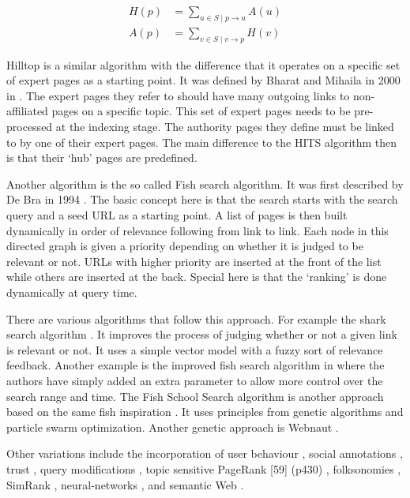 \begin{equation}
  \begin{split}
  H(p) &= \sum_{u\in S \mid p\to u}A(u)\\
  A(p) &= \sum_{v\in S \mid v\to p}H(v)
  \end{split}
  \label{eq:HITS}
\end{equation}

Hilltop is a similar algorithm with the difference that it operates on a specific set of expert pages as a starting point. It was defined by Bharat and Mihaila in 2000 in \autocite{Bharat2000}. The expert pages they refer to should have many outgoing links to non-affiliated pages on a specific topic. This set of expert pages needs to be pre-processed at the indexing stage. The authority pages they define must be linked to by one of their expert pages. The main difference to the HITS algorithm then is that their `hub' pages are predefined.

Another algorithm is the so called Fish search algorithm. It was first described by De Bra in 1994 \autocite{DeBra1994, DeBra1994a, DeBra}. The basic concept here is that the search starts with the search query and a seed URL as a starting point. A list of pages is then built dynamically in order of relevance following from link to link. Each node in this directed graph is given a priority depending on whether it is judged to be relevant or not. URLs with higher priority are inserted at the front of the list while others are inserted at the back. Special here is that the `ranking' is done dynamically at query time.

There are various algorithms that follow this approach. For example the shark search algorithm \autocite{Hersovici1998}. It improves the process of judging whether or not a given link is relevant or not. It uses a simple vector model with a fuzzy sort of relevance feedback. Another example is the improved fish search algorithm in \autocite{Luo2005} where the authors have simply added an extra parameter to allow more control over the search range and time. The Fish School Search algorithm is another approach based on the same fish inspiration \autocite{BastosFilho2008}. It uses principles from genetic algorithms and particle swarm optimization. Another genetic approach is Webnaut \autocite{Nick2001}.

Other variations include the incorporation of user behaviour \autocite{Agichtein2006}, social annotations \autocite{Bao2007}, trust \autocite{Garcia-Molina2004}, query modifications \autocite{Glover2001}, topic sensitive PageRank [59] (p430) \autocite{Haveliwala2003}, folksonomies \autocite{Hotho}, SimRank \autocite{Jeh}, neural-networks \autocite{Shu1999}, and semantic Web \autocite{Widyantoro2001,Du2007,Ding,Kamps,Taye2009}.


